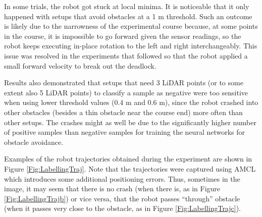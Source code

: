 In some trials, the robot got stuck at local minima. It is noticeable that it only happened with setups that avoid obstacles at a 1 m threshold. Such an outcome is likely due to the narrowness of the experimental course because, at some points in the course, it is impossible to go forward given the sensor readings, so the robot keeps executing in-place rotation to the left and right interchangeably. This issue was resolved in the experiments that followed so that the robot applied a small forward velocity to break out the deadlock.

Results also demonstrated that setups that need 3 LiDAR points (or to some extent also 5 LiDAR points) to classify a sample as negative were too sensitive when using lower threshold values (0.4 m and 0.6 m), since the robot crashed into other obstacles (besides a thin obstacle near the course end) more often than other setups. The crashes might as well be due to the significantly higher number of positive samples than negative samples for training the neural networks for obstacle avoidance.

Examples of the robot trajectories obtained during the experiment are shown in Figure \ref{Fig:LabellingTraj}. Note that the trajectories were captured using AMCL \cite{Fox1997,Thrun2006} which introduces some additional positioning errors. Thus, sometimes in the image, it may seem that there is no crash (when there is, as in Figure \ref{Fig:LabellingTrajb}) or vice versa, that the robot passes ``through'' obstacle (when it passes very close to the obstacle, as in Figure \ref{Fig:LabellingTrajc}).


